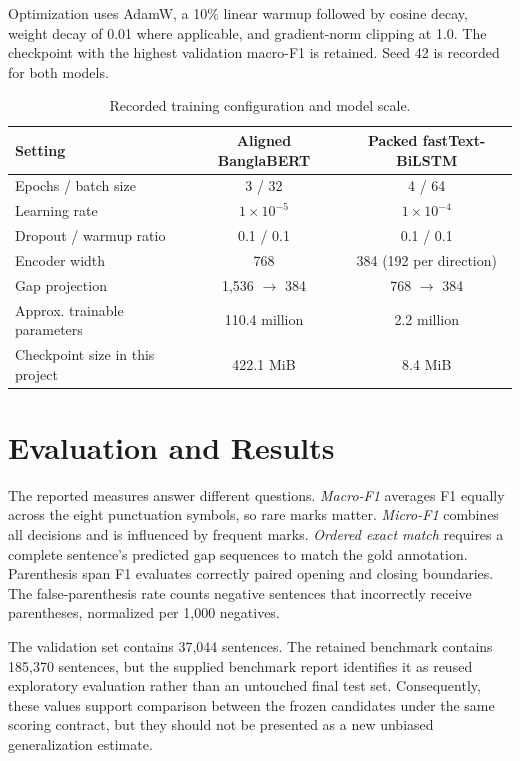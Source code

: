 \documentclass[11pt,a4paper]{article}
\begin{document}
Optimization uses AdamW, a 10\% linear warmup followed by cosine decay, weight decay of 0.01 where applicable, and gradient-norm clipping at 1.0. The checkpoint with the highest validation macro-F1 is retained. Seed 42 is recorded for both models.

\begin{table}[h]
\centering
\caption{Recorded training configuration and model scale.}
\small
\begin{tabularx}{\linewidth}{@{}Lcc@{}}
\toprule
\textbf{Setting} & \textbf{Aligned BanglaBERT} & \textbf{Packed fastText-BiLSTM} \\
\midrule
Epochs / batch size & 3 / 32 & 4 / 64 \\
Learning rate & $1\times10^{-5}$ & $1\times10^{-4}$ \\
Dropout / warmup ratio & 0.1 / 0.1 & 0.1 / 0.1 \\
Encoder width & 768 & 384 (192 per direction) \\
Gap projection & 1,536 $\rightarrow$ 384 & 768 $\rightarrow$ 384 \\
Approx. trainable parameters & 110.4 million & 2.2 million \\
Checkpoint size in this project & 422.1 MiB & 8.4 MiB \\
\bottomrule
\end{tabularx}
\end{table}

\clearpage

\section{Evaluation and Results}
The reported measures answer different questions. \textit{Macro-F1} averages F1 equally across the eight punctuation symbols, so rare marks matter. \textit{Micro-F1} combines all decisions and is influenced by frequent marks. \textit{Ordered exact match} requires a complete sentence's predicted gap sequences to match the gold annotation. Parenthesis span F1 evaluates correctly paired opening and closing boundaries. The false-parenthesis rate counts negative sentences that incorrectly receive parentheses, normalized per 1,000 negatives.

The validation set contains 37,044 sentences. The retained benchmark contains 185,370 sentences, but the supplied benchmark report identifies it as reused exploratory evaluation rather than an untouched final test set. Consequently, these values support comparison between the frozen candidates under the same scoring contract, but they should not be presented as a new unbiased generalization estimate.
\end{document}
